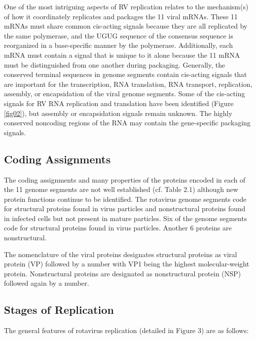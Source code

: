 One of the most intriguing aspects of RV replication relates to the mechanism(s) of how it coordinately replicates and packages the 11 viral mRNAs. These 11 mRNAs must share common cis-acting signals because they are all replicated by the same polymerase, and the UGUG sequence of the consensus sequence is reorganized in a base-specific manner by the polymerase. Additionally, each mRNA must contain a signal that is unique to it alone because the 11 mRNA must be distinguished from one another during packaging. Generally, the conserved terminal sequences in genome segments contain cis-acting signals that are important for the transcription, RNA translation, RNA transport, replication, assembly, or encapsidation of the viral genome segments. Some of the cis-acting signals for RV RNA replication and translation have been identified (Figure \ref{fig02}), but assembly or encapsidation signals remain unknown. The highly conserved noncoding regions of the RNA may contain the gene-specific packaging signals.

\subsection{Coding Assignments}

The coding assignments and many properties of the proteins encoded in each of the 11 genome segments are not well established (cf. Table 2.1) although new protein functions continue to be identified. The rotavirus genome segments code for structural proteins found in virus particles and nonstructural proteins found in infected cells but not present in mature particles. Six of the genome segments code for structural proteins found in virus particles. Another 6 proteins are nonstructural.

The nomenclature of the viral proteins designates structural proteins as viral protein (VP) followed by a number with VP1 being the highest molecular-weight protein. Nonstructural proteins are designated as nonstructural protein (NSP) followed again by a number.

\subsection{Stages of Replication}

The general features of rotavirus replication (detailed in Figure 3) are as follows:

